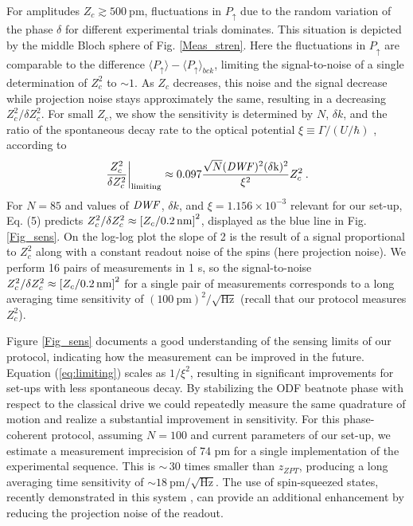 \documentclass[aps,prl,twocolumn,superscriptaddress,floatfix]{revtex4-1}
\begin{document}
For amplitudes $Z_{c}\gtrsim 500\:\mathrm{pm}$, fluctuations in $P_{\uparrow}$ due to the random variation of the phase $\delta$ for different experimental trials dominates. This situation is depicted by the middle Bloch sphere of Fig. \ref{Meas_stren}. Here the fluctuations in $P_{\uparrow}$ are comparable to the difference $\langle P_{\uparrow}\rangle - \langle P_{\uparrow} \rangle_{bck}$, limiting the signal-to-noise of a single determination of $Z_{c}^{2}$ to ${\sim} 1$. As $Z_{c}$ decreases, this noise and the signal decrease while projection noise stays approximately the same, resulting
in a decreasing $Z_{c}^{2}/\delta Z_{c}^{2}$. For small $Z_c$, we show the sensitivity is determined by $N$, $\delta k$, and the ratio of the spontaneous decay rate to the optical potential $\xi\equiv\Gamma/\left(U/\hbar\right)$ \citep{SuppMat}, according to
\begin{equation}
\left.\frac{Z_{c}^{2}}{\delta Z_{c}^{2}}\right|_{\mathrm{limiting}}\approx 0.097 \frac{\sqrt{N}(\rm{\it{DWF}})^2 (\delta k)^2}{\xi^2} Z_c^2\:.\label{eq:limiting}
\end{equation}
For $N=85$ and values of $\rm{\it{DWF}}$, $\delta k$, and $\xi=1.156\times10^{-3}$ relevant for our set-up, Eq. (5) predicts $Z_c^2/\delta Z_c^2 \approx \left[ Z_c/ 0.2 \, \rm{nm} \right]^2$, displayed as the blue line in Fig. \ref{Fig_sens}. On the log-log plot the slope of 2 is the result of a signal proportional to $Z_c^2$ along with a constant readout noise of the spins (here projection noise). We perform 16 pairs of measurements in 1 s, so the signal-to-noise ${Z_{c}^{2}}/{\delta Z_{c}^{2}} \approx \left[ Z_c/ 0.2 \, \rm{nm} \right]^2$ for a single pair of measurements corresponds to a long averaging time sensitivity of $\left(100\:\mathrm{pm}\right)^{2}/\sqrt{\mathrm{Hz}}$ (recall that our protocol measures $Z_{c}^2$).

Figure \ref{Fig_sens} documents a good understanding of the sensing limits of our protocol, indicating how the measurement can be improved in the future. Equation (\ref{eq:limiting}) scales as $1/\xi^{2}$, resulting in significant improvements for set-ups with less spontaneous decay. By stabilizing the ODF beatnote phase with respect to the classical drive \citep{Hume2011, Biercuk2011} we could repeatedly measure the same quadrature of motion and realize a substantial improvement in sensitivity. For this phase-coherent protocol, assuming $N=100$ and current parameters of our set-up, we estimate \citep{SuppMat} a measurement imprecision of 74 pm for a single implementation of the experimental sequence. This is ${\sim} \,30$ times smaller than $z_{ZPT}$, producing a long averaging time sensitivity of ${\sim}18\:\mathrm{pm/\sqrt{\mathrm{Hz}}}$. The use of spin-squeezed states, recently demonstrated in this system \citep{Bohnet2015}, can provide an additional enhancement by reducing the projection noise of the readout.
\end{document}
